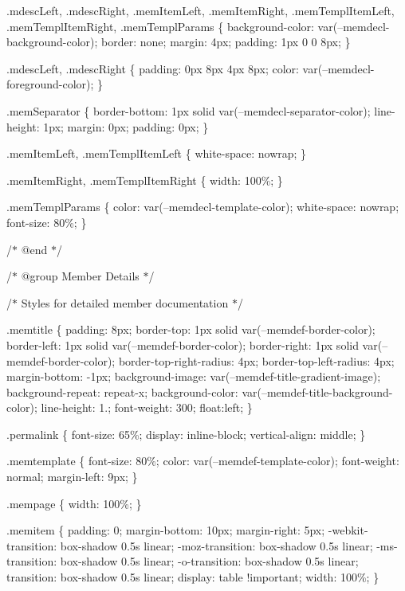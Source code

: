 .mdesc\+Left, .mdesc\+Right, .mem\+Item\+Left, .mem\+Item\+Right, .mem\+Templ\+Item\+Left, .mem\+Templ\+Item\+Right, .mem\+Templ\+Params \{ background-\/color\+: var(--memdecl-\/background-\/color); border\+: none; margin\+: 4px; padding\+: 1px 0 0 8px; \}

.mdesc\+Left, .mdesc\+Right \{ padding\+: 0px 8px 4px 8px; color\+: var(--memdecl-\/foreground-\/color); \}

.mem\+Separator \{ border-\/bottom\+: 1px solid var(--memdecl-\/separator-\/color); line-\/height\+: 1px; margin\+: 0px; padding\+: 0px; \}

.mem\+Item\+Left, .mem\+Templ\+Item\+Left \{ white-\/space\+: nowrap; \}

.mem\+Item\+Right, .mem\+Templ\+Item\+Right \{ width\+: 100\%; \}

.mem\+Templ\+Params \{ color\+: var(--memdecl-\/template-\/color); white-\/space\+: nowrap; font-\/size\+: 80\%; \}

/\texorpdfstring{$\ast$}{*} @end \texorpdfstring{$\ast$}{*}/

/\texorpdfstring{$\ast$}{*} @group Member Details \texorpdfstring{$\ast$}{*}/

/\texorpdfstring{$\ast$}{*} Styles for detailed member documentation \texorpdfstring{$\ast$}{*}/

.memtitle \{ padding\+: 8px; border-\/top\+: 1px solid var(--memdef-\/border-\/color); border-\/left\+: 1px solid var(--memdef-\/border-\/color); border-\/right\+: 1px solid var(--memdef-\/border-\/color); border-\/top-\/right-\/radius\+: 4px; border-\/top-\/left-\/radius\+: 4px; margin-\/bottom\+: -\/1px; background-\/image\+: var(--memdef-\/title-\/gradient-\/image); background-\/repeat\+: repeat-\/x; background-\/color\+: var(--memdef-\/title-\/background-\/color); line-\/height\+: 1.; font-\/weight\+: 300; float\+:left; \}

.permalink \{ font-\/size\+: 65\%; display\+: inline-\/block; vertical-\/align\+: middle; \}

.memtemplate \{ font-\/size\+: 80\%; color\+: var(--memdef-\/template-\/color); font-\/weight\+: normal; margin-\/left\+: 9px; \}

.mempage \{ width\+: 100\%; \}

.memitem \{ padding\+: 0; margin-\/bottom\+: 10px; margin-\/right\+: 5px; -\/webkit-\/transition\+: box-\/shadow 0.\+5s linear; -\/moz-\/transition\+: box-\/shadow 0.\+5s linear; -\/ms-\/transition\+: box-\/shadow 0.\+5s linear; -\/o-\/transition\+: box-\/shadow 0.\+5s linear; transition\+: box-\/shadow 0.\+5s linear; display\+: table !important; width\+: 100\%; \}

